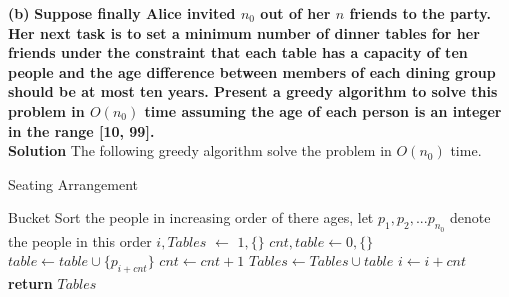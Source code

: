 \documentclass[a4paper]{article}
\begin{document}
\textbf{(b)} \textbf {Suppose finally Alice invited $n_{0}$ out of her $n$ friends to the party. Her next task is to set a minimum number of dinner tables for her friends under the constraint that each table has a capacity of ten people and the age difference between members of each dining group should be at most ten years. Present a greedy algorithm to solve this problem in $O(n_{0})$ time assuming the age of each person is an integer in the range [10, 99].} \\

\textbf{Solution} 
The following greedy algorithm solve the problem in $O(n_{0})$ time. 
\begin{algorithm}
\caption{Seating Arrangement}
\label{algo}
\begin{algorithmic}

\State  Bucket Sort the people in increasing order of there ages, let $p_{1},p_{2},...p_{n_{0}}$ denote the people in this order 
\State $i,Tables$ $\gets$ $1,\{\}$ 
  \State $cnt,table \gets 0,\{\}$
    \State $table \gets table \cup \{p_{i+cnt}\}$
    \State $cnt \gets cnt+1$
  \EndWhile
  \State $Tables \gets Tables \cup table$
  \State $i \gets i+cnt$
\EndWhile \\
\textbf{return} $Tables$
\end{algorithmic}
\end{algorithm}

\\
\end{document}

